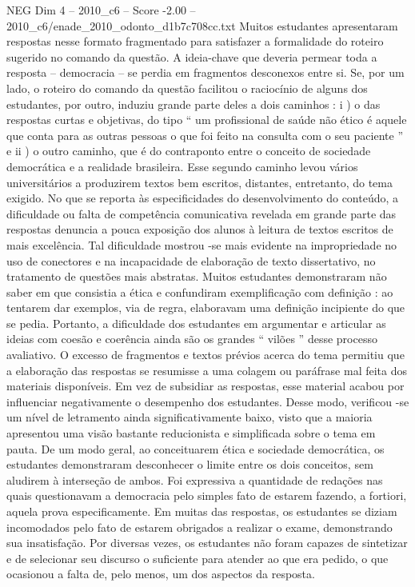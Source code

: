 \begin{textsample}{NEG Dim 4 – 2010\_c6 – Score -2.00 – 2010\_c6/enade\_2010\_odonto\_d1b7c708cc.txt}
Muitos estudantes apresentaram respostas nesse formato fragmentado para satisfazer a formalidade do roteiro sugerido no comando da questão.
A ideia-chave que deveria permear toda a resposta – democracia – se perdia em fragmentos desconexos entre si.
Se, por um lado, o roteiro do comando da questão facilitou o raciocínio de alguns dos estudantes, por outro, induziu grande parte deles a dois caminhos : i ) o das respostas curtas e objetivas, do tipo “ um profissional de saúde não ético é aquele que conta para as outras pessoas o que foi feito na consulta com o seu paciente ” e ii ) o outro caminho, que é do contraponto entre o conceito de sociedade democrática e a realidade brasileira.
Esse segundo caminho levou vários universitários a produzirem textos bem escritos, distantes, entretanto, do tema exigido.
No que se reporta às especificidades do desenvolvimento do conteúdo, a dificuldade ou falta de competência comunicativa revelada em grande parte das respostas denuncia a pouca exposição dos alunos à leitura de textos escritos de mais excelência.
Tal dificuldade mostrou -se mais evidente na impropriedade no uso de conectores e na incapacidade de elaboração de texto dissertativo, no tratamento de questões mais abstratas.
Muitos estudantes demonstraram não saber em que consistia a ética e confundiram exemplificação com definição : ao tentarem dar exemplos, via de regra, elaboravam uma definição incipiente do que se pedia.
Portanto, a dificuldade dos estudantes em argumentar e articular as ideias com coesão e coerência ainda são os grandes “ vilões ” desse processo avaliativo.
O excesso de fragmentos e textos prévios acerca do tema permitiu que a elaboração das respostas se resumisse a uma colagem ou paráfrase mal feita dos materiais disponíveis.
Em vez de subsidiar as respostas, esse material acabou por influenciar negativamente o desempenho dos estudantes.
Desse modo, verificou -se um nível de letramento ainda significativamente baixo, visto que a maioria apresentou uma visão bastante reducionista e simplificada sobre o tema em pauta.
De um modo geral, ao conceituarem ética e sociedade democrática, os estudantes demonstraram desconhecer o limite entre os dois conceitos, sem aludirem à interseção de ambos.
Foi expressiva a quantidade de redações nas quais questionavam a democracia pelo simples fato de estarem fazendo, a fortiori, aquela prova especificamente.
Em muitas das respostas, os estudantes se diziam incomodados pelo fato de estarem obrigados a realizar o exame, demonstrando sua insatisfação.
Por diversas vezes, os estudantes não foram capazes de sintetizar e de selecionar seu discurso o suficiente para atender ao que era pedido, o que ocasionou a falta de, pelo menos, um dos aspectos da resposta.

\end{textsample}
